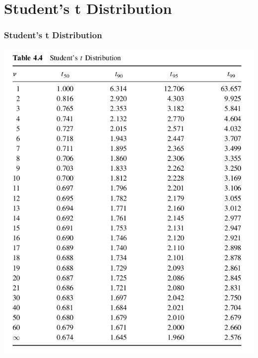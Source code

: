 \documentclass[fleqn]{beamer} %
\newcommand{\sectiontitleIV}{Student's t Distribution}
\begin{document}
\section{\sectiontitleIV}	
	\begin{frame}[label=sectionIV] \small
		\frametitle{\sectiontitleIV}    

\hspace*{0cm}\includegraphics[scale=.25]{topic4_fig2.png}

	\end{frame}
\end{document}
